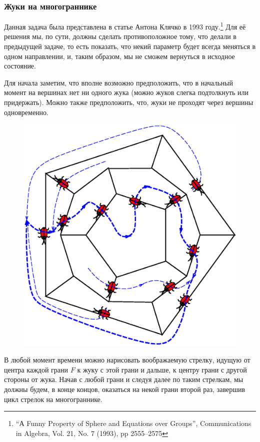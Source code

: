 \subsubsection*{Жуки на многограннике}%

Данная задача была представлена в статье Антона Клячко в 1993 году.\footnote{“А Funny Property of Sphere and Equations over Groups”, Communications in Algebra, Vol. 21, No. 7 (1993), pp 2555--2575} 
Для её решения мы, по сути, должны сделать противоположное тому, что делали в предыдущей задаче, то есть показать, что некий параметр будет всегда меняться в одном направлении, и, таким образом, мы не сможем вернуться в исходное состояние.

\medskip

Для начала заметим, что вполне возможно предположить, что в начальный момент на вершинах нет ни одного жука (можно жуков слегка подтолкнуть или придержать).
Можно также предположить, что, жуки не проходят через вершины одновременно.

\begin{figure}[h!]
\centering
\includegraphics[scale=0.5]{Figs/Algorithms/dodec}
\end{figure}

В любой момент времени можно нарисовать воображаемую стрелку, идущую от центра каждой грани $F$ к жуку с этой грани и дальше, к центру грани с другой стороны от жука.
Начав с любой грани и следуя далее по таким стрелкам, мы должны будем, в конце концов, оказаться на некой грани второй раз, завершив цикл стрелок на многограннике.

